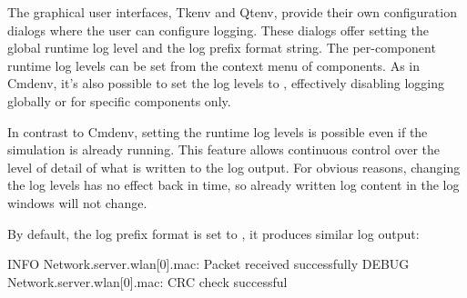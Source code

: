 The graphical user interfaces, Tkenv and Qtenv, provide their own configuration
dialogs where the user can configure logging. These dialogs offer setting the
global runtime log level and the log prefix format string. The per-component
runtime log levels can be set from the context menu of components. As in Cmdenv,
it's also possible to set the log levels to , effectively disabling
logging globally or for specific components only.

In contrast to Cmdenv, setting the runtime log levels is possible even if the
simulation is already running. This feature allows continuous control over the
level of detail of what is written to the log output. For obvious reasons,
changing the log levels has no effect back in time, so already written log
content in the log windows will not change.

By default, the log prefix format is set to , it produces
similar log output:

\begin{filelisting}
INFO  Network.server.wlan[0].mac: Packet received successfully
DEBUG Network.server.wlan[0].mac: CRC check successful
\end{filelisting}



